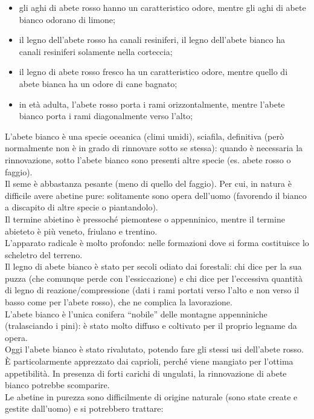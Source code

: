 \begin{itemize}[nosep]
    \item gli aghi di abete rosso hanno un caratteristico odore, mentre gli aghi di abete bianco odorano di limone;
    \item il legno dell'abete rosso ha canali resiniferi, il legno dell'abete bianco ha canali resiniferi solamente nella corteccia;
    \item il legno di abete rosso fresco ha un caratteristico odore, mentre quello di abete bianca ha un odore di cane bagnato;
    \item in età adulta, l'abete rosso porta i rami orizzontalmente, mentre l'abete bianco porta i rami diagonalmente verso l'alto;
   \end{itemize}
L'abete bianco è una specie oceanica (climi umidi), sciafila, definitiva (però normalmente non è in grado di rinnovare sotto se stessa): quando è necessaria la rinnovazione, sotto l'abete bianco sono presenti altre specie (es. abete rosso o faggio).\\
Il seme è abbastanza pesante (meno di quello del faggio). Per cui, in natura è difficile avere abetine pure: solitamente sono opera dell'uomo (favorendo il bianco a discapito di altre specie o piantandolo).\\
Il termine abietino è pressoché piemontese o appenninico, mentre il termine abieteto è più veneto, friulano e trentino.\\
L'apparato radicale è molto profondo: nelle formazioni dove si forma costituisce lo scheletro del terreno.\\
Il legno di abete bianco è stato per secoli odiato dai forestali: chi dice per la sua puzza (che comunque perde con l'essiccazione) e chi dice per l'eccessiva quantità di legno di reazione/compressione (dati i rami portati verso l'alto e non verso il basso come per l'abete rosso), che ne complica la lavorazione.\\
L'abete bianco è l'unica conifera ``nobile'' delle montagne appenniniche (tralasciando i pini): è stato molto diffuso e coltivato per il proprio legname da opera.\\
Oggi l'abete bianco è stato rivalutato, potendo fare gli stessi usi dell'abete rosso.\\
È particolarmente apprezzato dai caprioli, perché viene mangiato per l'ottima appetibilità. In presenza di forti carichi di ungulati, la rinnovazione di abete bianco potrebbe scomparire.\\
Le abetine in purezza sono difficilmente di origine naturale (sono state create e gestite dall'uomo) e si potrebbero trattare:
